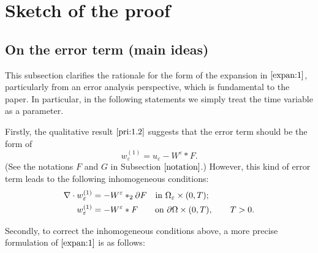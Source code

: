 \documentclass[13pt,CJK]{article}
\theoremstyle{plain}                       %
\theoremstyle{remark}
\numberwithin{equation}{section}
\begin{document}
\section{Sketch of the proof}\label{sec1}


\subsection{\centering On the error term (main ideas)}\label{subsec:1.2}

\noindent
This subsection clarifies the rationale for the form of the expansion in $\eqref{expan:1}$, particularly from an error analysis perspective, which is fundamental to the paper. In particular, in the following statements we simply treat the time variable as a parameter.

%

\medskip

Firstly, the qualitative result $\eqref{pri:1.2}$
suggests that
the error term should be the form of
\begin{equation}\label{expan:2}
  w_\varepsilon^{(1)} = u_\varepsilon - W^{\varepsilon}*F.
\end{equation}
(See the notations $F$ and $G$ in Subsection $\ref{notation}$.)
However, this kind of error term leads to the following inhomogeneous conditions:
\begin{equation*}
\begin{aligned}
\nabla\cdot w_\varepsilon^{(1)}&=-W^\varepsilon*_2\partial F
\text{\quad in~} \Omega_{\varepsilon}\times(0,T);\\
w_\varepsilon^{(1)} &=-W^\varepsilon* F
\text{\qquad on~} \partial\Omega\times(0,T), \qquad T>0.
\end{aligned}
\end{equation*}

\medskip


Secondly, to correct the inhomogeneous conditions above,
a more precise formulation of $\eqref{expan:1}$ is as follows:
\end{document}
